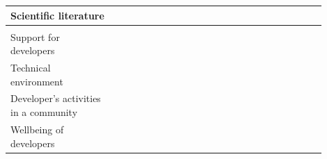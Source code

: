 \documentclass[english, 12pt, a4paper, sci, utf8, a-1b, online]{aaltothesis}
\begin{document}
\renewcommand{\arraystretch}{1.5}
\begin{center}
  \begin{longtable}{p{0.3\linewidth}p{0.6\linewidth}}
    \textbf{Scientific literature}                                                                                                                                                                                                                                                                                                                     \\
    \hline                                                                                                                                                                                                                                                                                                                                             \\
    Support for developers                     & \textcite{fontao2017investigating} \newline \textcite{fontao2016mseco} \newline \textcite{fontao2018mobile}                                                                                                                                                                                           \\
    Technical environment                      & \textcite{flow-intrinsic-dx} \newline \textcite{kuusinen2016software} \newline \textcite{programmer-experience}                                                                                                                                                                                       \\
    Developer's activities in a community      & \textcite{fontao2015research} \newline \textcite{design-framework-enhancing} \newline \textcite{oran2017set} \newline \textcite{open-service-innovation} \newline \textcite{claussen2019role}                                                                                                        \\
    Wellbeing of developers                    & \textcite{what-happens-when-unhappy} \newline  \textcite{consequences-of-unhappiness} \newline \textcite{fontao2017facing} \newline \textcite{unhappy-developers} \newline \textcite{on-the-unhappiness}                                                                                              \\

\end{longtable}
\end{center}
\end{document}
